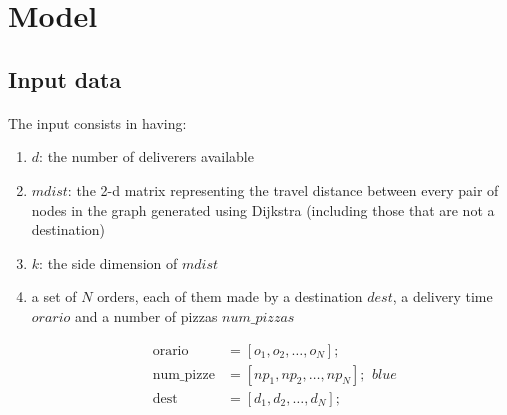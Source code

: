 \documentclass[10pt]{article}
\begin{document}
	\section{Model}
	\label{Model}

	
	\subsection{Input data}

	\paragraph*{}
	The input consists in having:
	\begin{enumerate}
		\item $d$: the number of deliverers available
		\item $mdist$: the 2-d matrix representing the travel distance between
			every pair of nodes in the graph generated using Dijkstra (including those
			that are not a destination)
		\item $k$: the side dimension of $mdist$
		\item a set of $N$ orders, each of them made by a destination $dest$, a delivery 
			time $orario$ and a number of pizzas $num\_pizzas$

			\begin{equation*}
				\begin{split}
					\text{orario} &= [o_1, o_2, \dots, o_N];\\
					\text{num\_pizze} &= [np_1, np_2, \dots, np_N];\\
					\text{dest} &= [d_1, d_2, \dots, d_N];
				\end{split}	blue
			\end{equation*}

	\end{enumerate}
\end{document}
